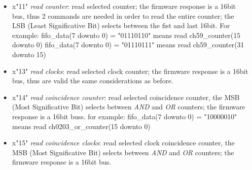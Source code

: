 \begin{itemize}
\begin{itemize}
		\item x"11" \textit{read counter}: read selected counter; the firmware response is a 16bit bus, thus 2 commands are needed in order to read the entire counter; the LSB (Least Significative Bit) selects between the fist and last 16bit. For example:
		\newline
		fifo\_data(7 downto 0) = "01110110" means read ch59\_counter(15 downto 0)
		\newline
		fifo\_data(7 downto 0) = "01110111" means read ch59\_counter(31 downto 15)
		\item x"13" \textit{read clocks}: read selected clock counter; the firmware response is a 16bit bus, thus are valid the same considerations as before.
		\item x"14" \textit{read coincidence counter}: read selected coincidence counter, the MSB (Most Significative Bit) selects between \textit{AND} and \textit{OR} counters; the firmware response is a 16bit buss. for example:
		\newline
		fifo\_data(7 downto 0) = "10000010" means read ch0203\_or\_counter(15 downto 0)
		\item x"15" \textit{read coincidence clocks}: read selected clock coincidence counter, the MSB (Most Significative Bit) selects between \textit{AND} and \textit{OR} counters; the firmware response is a 16bit bus.
	\end{itemize}
	

\end{itemize}
